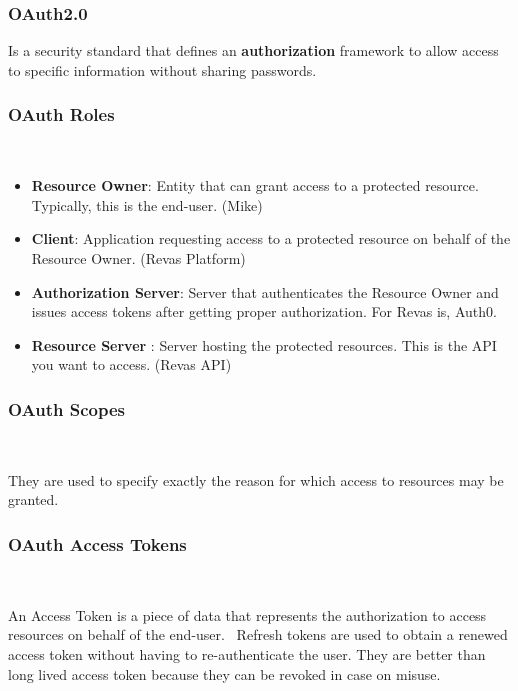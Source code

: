 \documentclass{beamer}
\begin{document}
\begin{frame}
	\frametitle{OAuth2.0}
	
	Is a security standard that defines an \textbf{authorization} framework to allow access to specific information without sharing passwords.  \newline
\end{frame}

\begin{frame}
	\frametitle{OAuth Roles}\
	
	\begin{itemize}	
		\item  {\footnotesize \textbf{\textcolor{revassecondary}{Resource Owner}}}: Entity that can grant access to a protected resource. Typically, this is the end-user. (Mike)
		\item  {\footnotesize \textbf{\textcolor{revassecondary}{Client}}}: Application requesting access to a protected resource on behalf of the Resource Owner. (Revas Platform)
		\item  {\footnotesize \textbf{\textcolor{revassecondary}{Authorization Server}}}: Server that authenticates the Resource Owner and issues access tokens after getting proper authorization. For Revas is, Auth0.
		\item   {\footnotesize \textbf{\textcolor{revassecondary}{Resource Server}}} : Server hosting the protected resources. This is the API you want to access.  (Revas API)
	\end{itemize}	
\end{frame}

\begin{frame}
	\frametitle{OAuth Scopes}\
	
	They are used to specify exactly the reason for which access to resources may be granted.	
\end{frame}

\begin{frame}
	\frametitle{OAuth Access Tokens}\
	
	An Access Token is a piece of data that represents the authorization to access resources on behalf of the end-user.\ \newline
	Refresh tokens are used to obtain a renewed access token without having to re-authenticate the user. They are better than long lived access token because they can be revoked in case on misuse.
\end{frame}
\end{document}
